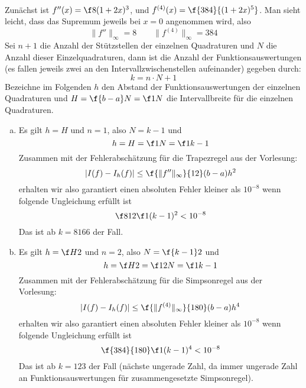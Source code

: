 \documentclass{mywork}
\begin{document}
\setcounter{aufgabe}{1}
\begin{aufgabe}~

	Zunächst ist $f''(x) = \f 8{(1+2x)^3}$, und $f^{(4)}(x) = \f {384}{(1+2x)^5}$.
	Man sieht leicht, dass das Supremum jeweils bei $x=0$ angenommen wird, also
	\[
		\|f''\|_\infty = 8
		\qquad
		\|f^{(4)}\|_\infty = 384
	\]
	Sei $n+1$ die Anzahl der Stützstellen der einzelnen Quadraturen und $N$ die Anzahl dieser Einzelquadraturen, dann ist die Anzahl der Funktionsauswertungen (es fallen jeweils zwei an den Intervallzwischenstellen aufeinander) gegeben durch:
	\[
		k = n \cdot N + 1
	\]
	Bezeichne im Folgenden $h$ den Abstand der Funktionsauswertungen der einzelnen Quadraturen und $H=\f{b-a}N = \f 1N$ die Intervallbreite für die einzelnen Quadraturen.
	\begin{enumerate}[a)]
		\item
			Es gilt $h = H$ und $n=1$, also $N=k-1$ und
			\[
				h = H = \f 1N = \f 1{k-1}
			\]
			Zusammen mit der Fehlerabschätzung für die Trapezregel aus der Vorlesung:
			\[
				|I(f) - I_h(f)| \le \f {\|f''\|_\infty}{12} (b-a)h^2
			\]
			erhalten wir also garantiert einen absoluten Fehler kleiner als $10^{-8}$ wenn folgende Ungleichung erfüllt ist
			\[
				\f 8{12} \f 1{(k-1)^2} < 10^{-8}
			\]
			Das ist ab $k=8166$ der Fall.
		\item
			Es gilt $h = \f H2$ und $n=2$, also $N= \f{k-1}2$ und
			\[
				h = \f H2 = \f 1{2N} = \f 1{k-1}
			\]
			Zusammen mit der Fehlerabschätzung für die Simpsonregel aus der Vorlesung:
			\[
				|I(f) - I_h(f)| \le \f {\|f^{(4)}\|_\infty}{180} (b-a)h^4
			\]
			erhalten wir also garantiert einen absoluten Fehler kleiner als $10^{-8}$ wenn folgende Ungleichung erfüllt ist
			\[
				\f {384}{180}\f 1{(k-1)^4} < 10^{-8}
			\]
			Das ist ab $k=123$ der Fall (nächste ungerade Zahl, da immer ungerade Zahl an Funktionsauswertungen für zusammengesetzte Simpsonregel).
	\end{enumerate}

\end{aufgabe}
\end{document}
